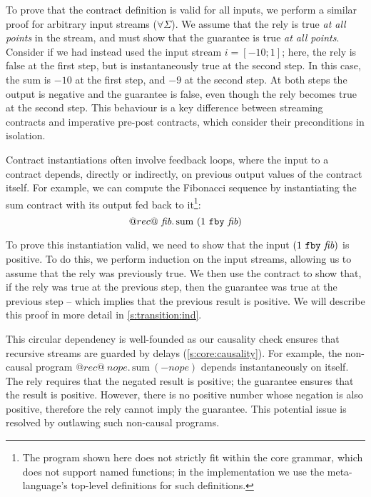 To prove that the contract definition is valid for all inputs, we perform a similar proof for arbitrary input streams ($\forall \Sigma$).
We assume that the rely is true \emph{at all points} in the stream, and must show that the guarantee is true \emph{at all points}.
Consider if we had instead used the input stream $i = [-10; 1]$; here, the rely is false at the first step, but is instantaneously true at the second step.
In this case, the sum is $-10$ at the first step, and $-9$ at the second step.
At both steps the output is negative and the guarantee is false, even though the rely becomes true at the second step.
This behaviour is a key difference between streaming contracts and imperative pre-post contracts, which consider their preconditions in isolation.

Contract instantiations often involve feedback loops, where the input to a contract depends, directly or indirectly, on previous output values of the contract itself.
For example, we can compute the Fibonacci sequence by instantiating the sum contract with its output fed back to it\footnote{The program shown here does not strictly fit within the core grammar, which does not support named functions; in the implementation we use the \fstar{} meta-language's top-level definitions for such definitions.}:
$$
  @rec@~\textit{fib}.\, \text{sum}~(1~\texttt{fby}~\textit{fib})
$$

To prove this instantiation valid, we need to show that the input $(1~\texttt{fby}~\textit{fib})$ is positive.
To do this, we perform induction on the input streams, allowing us to assume that the rely was previously true.
We then use the contract to show that, if the rely was true at the previous step, then the guarantee was true at the previous step -- which implies that the previous result is positive.
We will describe this proof in more detail in \autoref{s:transition:ind}.

This circular dependency is well-founded as our causality check ensures that recursive streams are guarded by delays (\autoref{s:core:causality}).
For example, the non-causal program $@rec@~\textit{nope}.\, \text{sum}~(-\textit{nope})$ depends instantaneously on itself.
The rely requires that the negated result is positive; the guarantee ensures that the result is positive.
However, there is no positive number whose negation is also positive, therefore the rely cannot imply the guarantee.
This potential issue is resolved by outlawing such non-causal programs.


